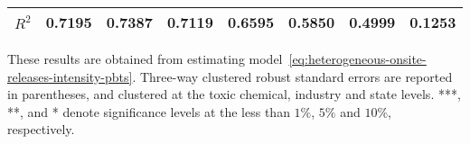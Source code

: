 \begin{table}[H]
{\begin{tabular}{@{}llllllll@{}}
            $R^2$                           & 0.7195    & 0.7387        & 0.7119    & 0.6595       & 0.5850          & 0.4999        & 0.1253              \\ \bottomrule\bottomrule
        \end{tabular}%
    }
    \begin{minipage}{18cm}
        \vspace{0.05in}
        These results are obtained from estimating model~\ref{eq:heterogeneous-onsite-releases-intensity-pbts}. Three-way clustered robust standard errors are reported in parentheses, and clustered at the toxic chemical, industry and state levels. ***, **, and * denote significance levels at the less than $1\%$, $5\%$ and $10\%$, respectively.
    \end{minipage}
\end{table}